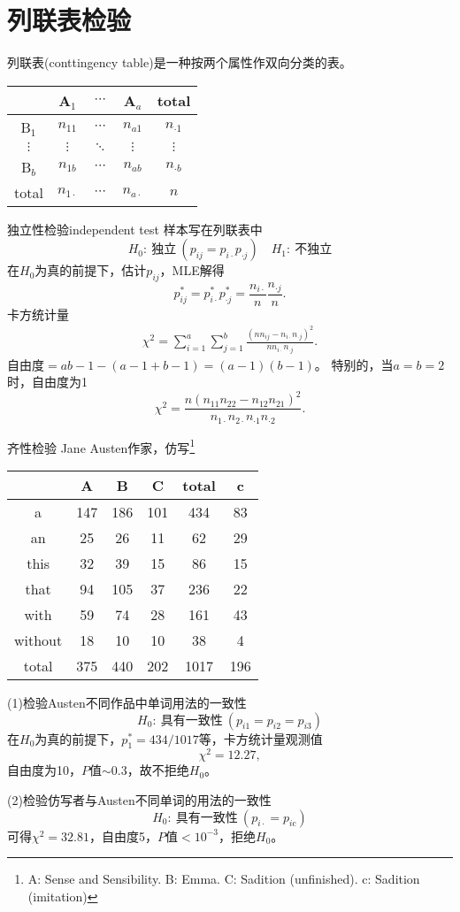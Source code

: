 \section{列联表检验}
列联表(conttingency table)是一种按两个属性作双向分类的表。
\begin{center}
	\begin{tabular}{c|ccc|c}
		\toprule
		&A$_1$&$\cdots$&A$_a$&total\\
		\hline
		B$_1$&$n_{11}$&$\cdots$&$n_{a1}$&$n_{\cdot 1}$\\
		$\vdots$&$\vdots$&$\ddots$&$\vdots$&$\vdots$\\
		B$_b$&$n_{1b}$&$\cdots$&$n_{ab}$&$n_{\cdot b}$\\
		\hline
		total&$n_{1\cdot}$&$\cdots$&$n_{a\cdot}$&$n$\\
		\bottomrule
	\end{tabular}
\end{center}
\begin{example}{独立性检验}{independent test}
	样本写在列联表中
	\[
		H_0:~\text{独立}~(p_{ij}=p_{i\cdot}p_{\cdot j})\quad H_1:~\text{不独立}
	\]
	在$H_0$为真的前提下，估计$p_{ij}$，MLE解得
	\[
		p_{ij}^\ast=p_{i\cdot}^\ast p_{\cdot j}^\ast=\frac{n_{i\cdot}}n\frac{n_{\cdot j}}n.
	\]
	卡方统计量
	\begin{align}
		\chi^2=\sum_{i=1}^a\sum_{j=1}^b\frac{(nn_{ij}-n_{i\cdot}n_{\cdot j})^2}{nn_{i\cdot}n_{\cdot j}}.
	\end{align}
	自由度$=ab-1-(a-1+b-1)=(a-1)(b-1)$。
	\tcblower
	特别的，当$a=b=2$时，自由度为1
	\[
		\chi^2=\frac{n(n_{11}n_{22}-n_{12}n_{21})^2}{n_{1\cdot}n_{2\cdot}n_{\cdot 1}n_{\cdot 2}}.
	\]
\end{example}
\begin{example}{齐性检验}{}
	Jane Austen作家，仿写\footnote{A: Sense and Sensibility. B: Emma. C: Sadition (unfinished). c: Sadition (imitation)}
	\begin{center}
		\begin{tabular}{c|ccc|c|c}
			\toprule
			&A&B&C&total&c\\
			\hline
			a&147&186&101&434&83\\
			an&25&26&11&62&29\\
			this&32&39&15&86&15\\
			that&94&105&37&236&22\\
			with&59&74&28&161&43\\
			without&18&10&10&38&4\\
			\hline
			total&375&440&202&1017&196\\
			\bottomrule
		\end{tabular}
	\end{center}
	(1)检验Austen不同作品中单词用法的一致性
	\[
		H_0:~\text{具有一致性}~(p_{i1}=p_{i2}=p_{i3})
	\]
	在$H_0$为真的前提下，$p_1^\ast=434/1017$等，卡方统计量观测值
	\[
		\chi^2=12.27,
	\]
	自由度为10，$P$值$\sim 0.3$，故不拒绝$H_0$。

	(2)检验仿写者与Austen不同单词的用法的一致性
	\[
		H_0:~\text{具有一致性}~(p_{i\cdot}=p_{i\mathrm c})
	\]
	可得$\chi^2=32.81$，自由度5，$P$值$<10^{-3}$，拒绝$H_0$。
\end{example}
